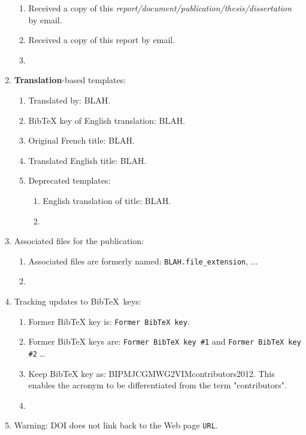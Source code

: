 \documentclass[letter,12pt]{article}
\begin{document}
\begin{enumerate}
	\begin{enumerate} \itemsep -2pt
	\item Received a copy of this {\it report/document/publication/thesis/dissertation} by email.
	\item Received a copy of this report by email.
	\item 
	\end{enumerate}
\item {\bf Translation}-based templates: \vspace{-0.3cm}
	\begin{enumerate} \itemsep -2pt
	\item Translated by: BLAH.
	\item BibTeX key of English translation: BLAH.
	\item Original French title: BLAH.
	\item Translated English title: BLAH.
	\item Deprecated templates: \vspace{-0.2cm}
		\begin{enumerate} \itemsep -2pt
		\item English translation of title: BLAH.
		\item 
		\end{enumerate}
	\end{enumerate}
\item Associated files for the publication: \vspace{-0.3cm}
	\begin{enumerate} \itemsep -2pt
	\item Associated files are formerly named: {\tt BLAH.file\_extension}, ...
	\item 
	\end{enumerate}
\item Tracking updates to {\sc Bib}\TeX\ keys: \vspace{-0.3cm}
	\begin{enumerate} \itemsep -2pt
	\item Former BibTeX key is: {\tt Former BibTeX key}.
	\item Former BibTeX keys are: {\tt Former BibTeX key \#1} and {\tt Former BibTeX key \#2} \dots
	\item Keep BibTeX key as: BIPMJCGMWG2VIMcontributors2012. This enables the acronym to be differentiated from the term "contributors".
	\item 
	\end{enumerate}
\item Warning: DOI does not link back to the Web page {\tt URL}.

\end{enumerate}
\end{document}
